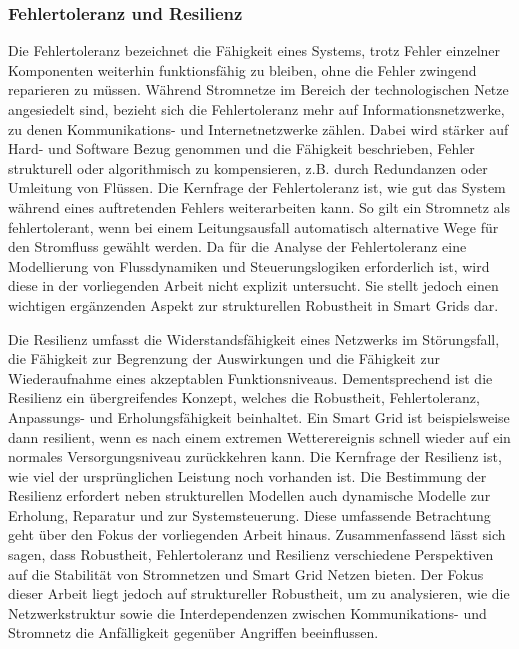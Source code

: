 \subsubsection{Fehlertoleranz und Resilienz}
Die Fehlertoleranz bezeichnet die Fähigkeit eines Systems, trotz Fehler einzelner Komponenten weiterhin funktionsfähig zu bleiben, ohne die Fehler zwingend reparieren zu müssen. Während Stromnetze im Bereich der technologischen Netze angesiedelt sind, bezieht sich die Fehlertoleranz mehr auf Informationsnetzwerke, zu denen Kommunikations- und Internetnetzwerke zählen. Dabei wird stärker auf Hard- und Software Bezug genommen und die Fähigkeit beschrieben, Fehler strukturell oder algorithmisch zu kompensieren, z.B. durch Redundanzen oder Umleitung von Flüssen. Die Kernfrage der Fehlertoleranz ist, wie gut das System während eines auftretenden Fehlers weiterarbeiten kann. So gilt ein Stromnetz als fehlertolerant, wenn bei einem Leitungsausfall automatisch alternative Wege für den Stromfluss gewählt werden. 
Da für die Analyse der Fehlertoleranz eine Modellierung von Flussdynamiken und Steuerungslogiken erforderlich ist, wird diese in der vorliegenden Arbeit nicht explizit untersucht. Sie stellt jedoch einen wichtigen ergänzenden Aspekt zur strukturellen Robustheit in Smart Grids dar. 

Die Resilienz umfasst die Widerstandsfähigkeit eines Netzwerks im Störungsfall, die Fähigkeit zur Begrenzung der Auswirkungen und die Fähigkeit zur Wiederaufnahme eines akzeptablen Funktionsniveaus. Dementsprechend ist die Resilienz ein übergreifendes Konzept, welches die Robustheit, Fehlertoleranz, Anpassungs- und Erholungsfähigkeit beinhaltet. Ein Smart Grid ist beispielsweise dann resilient, wenn es nach einem extremen Wetterereignis schnell wieder auf ein normales Versorgungsniveau zurückkehren kann. 
Die Kernfrage der Resilienz ist, wie viel der ursprünglichen Leistung noch vorhanden ist. Die Bestimmung der Resilienz erfordert neben strukturellen Modellen auch dynamische Modelle zur Erholung, Reparatur und zur Systemsteuerung. Diese umfassende Betrachtung geht über den Fokus der vorliegenden Arbeit hinaus. 
Zusammenfassend lässt sich sagen, dass Robustheit, Fehlertoleranz und Resilienz verschiedene Perspektiven auf die Stabilität von Stromnetzen und Smart Grid Netzen bieten. Der Fokus dieser Arbeit liegt jedoch auf struktureller Robustheit, um zu analysieren, wie die Netzwerkstruktur sowie die Interdependenzen zwischen Kommunikations- und Stromnetz die Anfälligkeit gegenüber Angriffen beeinflussen. 
